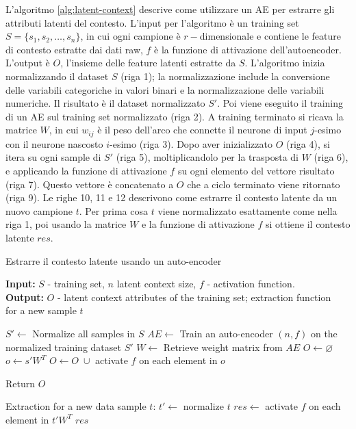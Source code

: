 \documentclass[12pt,italian]{report}
\begin{document}
L'algoritmo \autoref{alg:latent-context} descrive come utilizzare un AE per estrarre gli attributi latenti del contesto. L'input per l'algoritmo è un training set $S = \{s_1, s_2, \dots, s_n\}$, in cui ogni campione è $r-$dimensionale e contiene le feature di contesto estratte dai dati raw, $f$ è la funzione di attivazione dell'autoencoder. L'output è $O$, l'insieme delle feature latenti estratte da $S$. L'algoritmo inizia normalizzando il dataset $S$ (riga 1); la normalizzazione include la conversione delle variabili categoriche in valori binari e la normalizzazione delle variabili numeriche. Il risultato è il dataset normalizzato $S'$. Poi viene eseguito il training di un AE sul training set normalizzato (riga 2). A training terminato si ricava la matrice $W$, in cui $w_{ij}$ è il peso dell'arco che connette il neurone di input $j$-esimo con il neurone nascosto $i$-esimo (riga 3). Dopo aver inizializzato $O$ (riga 4), si itera su ogni sample di $S'$ (riga 5), moltiplicandolo per la trasposta di $W$ (riga 6), e applicando la funzione di attivazione $f$ su ogni elemento del vettore risultato (riga 7). Questo vettore è concatenato a $O$ che a ciclo terminato viene ritornato (riga 9). Le righe 10, 11 e 12 descrivono come estrarre il contesto latente da un nuovo campione $t$. Per prima cosa $t$ viene normalizzato esattamente come nella riga 1, poi usando la matrice $W$ e la funzione di attivazione $f$ si ottiene il contesto latente $res$.

\begin{algorithm}
\caption{Estrarre il contesto latente usando un auto-encoder \cite{latent-context}}
\label{alg:latent-context}
 \hspace*{\algorithmicindent} \textbf{Input:} $S$ - training set, $n$ latent context size, $f$ - activation function.\\
 \hspace*{\algorithmicindent} \textbf{Output:} $O$ - latent context attributes of the training set; extraction function\\ 
 \hspace*{\algorithmicindent} for a new sample $t$
\begin{algorithmic}[1]
\STATE $S' \leftarrow$ Normalize all samples in $S$
\STATE $AE \leftarrow$ Train an auto-encoder $(n,f)$ on the normalized training dataset $S'$
\STATE $W \leftarrow$ Retrieve weight matrix from $AE$
\STATE $O \leftarrow \varnothing$
	\STATE $o \leftarrow s'W^T$
	\STATE $O \leftarrow O \; \cup$ activate $f$ on each element in $o$ 
\ENDFOR

\STATE Return $O$

Extraction for a new data sample $t$:
\STATE $t' \leftarrow$ normalize $t$
\STATE $res \leftarrow$ activate $f$ on each element in $t'W^T$ 
\RETURN $res$

\end{algorithmic}
\end{algorithm}
\end{document}

